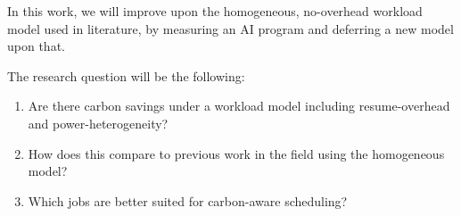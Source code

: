In this work, we will improve upon the homogeneous, no-overhead workload model used in literature, by measuring an AI program and deferring a new model upon that.

The research question will be the following:

\begin{enumerate}
    \item Are there carbon savings under a workload model including resume-overhead and power-heterogeneity?
    \item How does this compare to previous work in the field using the homogeneous model?
    \item Which jobs are better suited for carbon-aware scheduling?
\end{enumerate}

